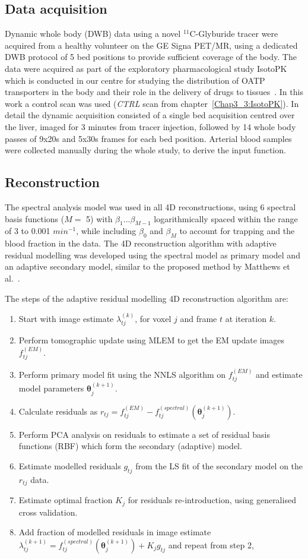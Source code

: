 \subsection{Data acquisition}
Dynamic whole body (DWB) data using a novel ${}^{11}$C-Glyburide tracer were acquired from a healthy volunteer on the GE Signa PET/MR, using a dedicated DWB protocol of 5 bed positions to provide sufficient coverage of the body. The data were acquired as part of the exploratory pharmacological study IsotoPK which is conducted in our centre for studying the distribution of OATP transporters in the body and their role in the delivery of drugs to tissues~\cite{Marie2019}. In this work a control scan was used (\textit{CTRL} scan from chapter~\ref{Chap3_3:IsotoPK}).
In detail the dynamic acquisition consisted of a single bed acquisition centred over the liver, imaged for 3 minutes from tracer injection, followed by 14 whole body passes of 9x20s and 5x30s frames for each bed position. 
Arterial blood samples were collected manually during the whole study, to derive the input function.
\subsection{Reconstruction}
The spectral analysis model was used in all 4D reconstructions, using 6 spectral basis functions ($M=$ 5) with $\beta_1 ... \beta_{M-1}$ logarithmically spaced within the range of 3 to 0.001 $min^{-1}$, while including $\beta_0$ and $\beta_{M}$ to account for trapping and the blood fraction in the data. The 4D reconstruction algorithm with adaptive residual modelling was developed using the spectral model as primary model and an adaptive secondary model, similar to the proposed method by Matthews et al.~\cite{Matthews2012}. 
 
The steps of the adaptive residual modelling 4D reconstruction algorithm are:

\begin{enumerate}
  \item Start with image estimate $\lambda_{tj}^{(k)}$, for voxel $j$ and frame $t$ at iteration $k$. 
  \item Perform tomographic update using MLEM to get the EM update images $f_{tj}^{(EM)}$.
  \item Perform primary model fit using the NNLS algorithm on $f_{tj}^{(EM)}$ and estimate model parameters $\bm{\theta}_{j}^{(k+1)}$.
  \item Calculate residuals as $ r_{tj} = f_{tj}^{(EM)} - f_{tj}^{(spectral)}(\bm{\theta}_{j}^{(k+1)}) $.
  \item Perform PCA analysis on residuals to estimate a set of residual basis functions (RBF) which form the secondary (adaptive) model. 
  \item Estimate modelled residuals $g_{tj}$ from the LS fit of the secondary model on the $r_{tj}$ data. 
  \item Estimate optimal fraction $K_{j}$ for residuals re-introduction, using generalised cross validation.
  \item Add fraction of modelled residuals in image estimate $\lambda_{tj}^{(k+1)} = f_{tj}^{(spectral)}(\bm{\theta}_{j}^{(k+1)}) + K_{j} g_{tj} $ and repeat from step 2, 
\end{enumerate}

